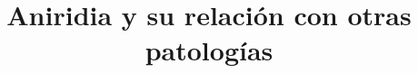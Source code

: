 \documentclass{bmcart}
\begin{document}
	
	\setlength{\parindent}{0pt} 

	\begin{frontmatter}
	
			
			
			\title{Aniridia y su relación con otras patologías}
			
			\author[
			addressref={aff1},                   %
			corref={aff1},                       %
			email={13albertomontero@uma.es}   %
			]{ } %
			
			\author[
			  addressref={aff1},                   %
			  email={teresavegamar@uma.es}   %
			]{ } %
			
			\author[
			addressref={aff1},                   %
			email={Alexandra.rodser.@gmail.com}   %
			]{ }
			
			\author[
			addressref={aff1},                   %
			email={Lilixia13@uma.es}   %
			]{ }
			
			\vspace{10pt}
			
			
			
			\address[id=aff1]{%
			  ,             %
			  ,          %
			  ,                              %
			}
		

\end{frontmatter}
\end{document}
